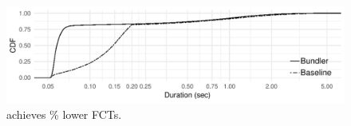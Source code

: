 \begin{figure}
    \centering
\begin{knitrout}
\color{fgcolor}
\includegraphics[width=\maxwidth]{figure/unnamed-chunk-1-1} 

\end{knitrout}
    \caption{\name achieves \% lower FCTs.}
    \label{fig:eval:test}
\end{figure}
